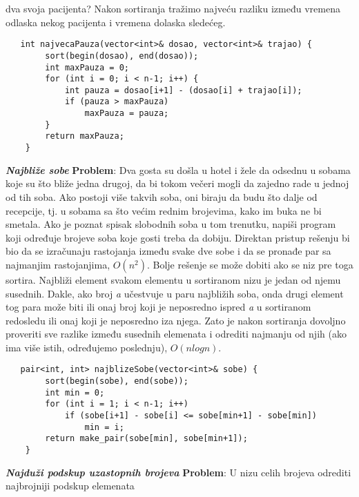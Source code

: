\documentclass{article}
\begin{document}
dva svoja pacijenta?
\newline Nakon sortiranja tražimo najveću razliku između vremena odlaska nekog
pacijenta i vremena dolaska sledećeg.
\begin{lstlisting}
   int najvecaPauza(vector<int>& dosao, vector<int>& trajao) {
        sort(begin(dosao), end(dosao));
        int maxPauza = 0;
        for (int i = 0; i < n-1; i++) {
            int pauza = dosao[i+1] - (dosao[i] + trajao[i]);
            if (pauza > maxPauza)
                maxPauza = pauza;
        }
        return maxPauza;
    }
\end{lstlisting}
\textit{\textbf{Najbliže sobe}}
\vspace{0.1cm}\newline
\textbf{Problem}: Dva gosta su došla u hotel i žele da odsednu u sobama koje su što
bliže jedna drugoj, da bi tokom večeri mogli da zajedno rade u jednoj od tih
soba. Ako postoji više takvih soba, oni biraju da budu što dalje od recepcije,
tj. u sobama sa što većim rednim brojevima, kako im buka ne bi smetala. Ako
je poznat spisak slobodnih soba u tom trenutku, napiši program koji određuje
brojeve soba koje gosti treba da dobiju.
\newline
Direktan pristup rešenju bi bio da se izračunaju rastojanja između svake dve sobe i da se pronađe par sa najmanjim rastojanjima, $O(n^2)$.
\newline
Bolje rešenje se može dobiti ako se niz pre toga sortira. Najbliži element
svakom elementu u sortiranom nizu je jedan od njemu susednih. Dakle, ako
broj \textit{a} učestvuje u paru najbližih soba, onda drugi element tog para može biti
ili onaj broj koji je neposredno ispred \textit{a} u sortiranom redosledu ili onaj koji
je neposredno iza njega. Zato je nakon sortiranja dovoljno proveriti sve razlike između susednih
elemenata i odrediti najmanju od njih (ako ima više istih, određujemo poslednju), $O(nlogn)$.
\begin{lstlisting}
   pair<int, int> najblizeSobe(vector<int>& sobe) {
        sort(begin(sobe), end(sobe));
        int min = 0;
        for (int i = 1; i < n-1; i++)
            if (sobe[i+1] - sobe[i] <= sobe[min+1] - sobe[min])
                min = i;
        return make_pair(sobe[min], sobe[min+1]);
    }
\end{lstlisting}
\vspace{0.2cm}
\textit{\textbf{Najduži podskup uzastopnih brojeva}}
\vspace{0.1cm}\newline
\textbf{Problem}: U nizu celih brojeva odrediti najbrojniji podskup elemenata
\end{document}
